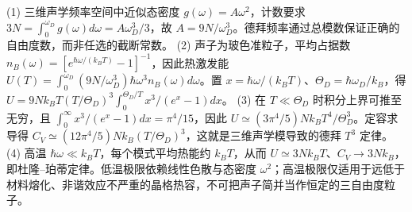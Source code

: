 (1) 三维声学频率空间中近似态密度 \(g(\omega)=A\omega^2\)，计数要求 \(3N=\int_0^{\omega_D}g(\omega)d\omega=A\omega_D^3/3\)，故 \(A=9N/\omega_D^3\)。德拜频率通过总模数保证正确的自由度数，而非任选的截断常数。
(2) 声子为玻色准粒子，平均占据数 \(n_B(\omega)=[e^{\hbar\omega/(k_BT)}-1]^{-1}\)，因此热激发能 \(U(T)=\int_0^{\omega_D}(9N/\omega_D^3)\hbar\omega^3n_B(\omega)d\omega\)。置 \(x=\hbar\omega/(k_BT)\)、\(\Theta_D=\hbar\omega_D/k_B\)，得 \(U=9Nk_BT(T/\Theta_D)^3\int_0^{\Theta_D/T}x^3/(e^x-1)dx\)。
(3) 在 \(T\ll\Theta_D\) 时积分上界可推至无穷，且 \(\int_0^\infty x^3/(e^x-1)dx=\pi^4/15\)，因此 \(U\simeq(3\pi^4/5)Nk_BT^4/\Theta_D^3\)。定容求导得 \(C_V\simeq(12\pi^4/5)Nk_B(T/\Theta_D)^3\)，这就是三维声学模导致的德拜 \(T^3\) 定律。
(4) 高温 \(\hbar\omega\ll k_BT\)，每个模式平均热能约 \(k_BT\)，从而 \(U\simeq3Nk_BT\)、\(C_V\to3Nk_B\)，即杜隆–珀蒂定律。低温极限依赖线性色散与态密度 \(\omega^2\)；高温极限仅适用于远低于材料熔化、非谐效应不严重的晶格热容，不可把声子简并当作恒定的三自由度粒子。
